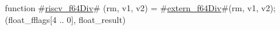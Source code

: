 function #\hyperref[sailRISCVzriscvzyf64Div]{riscv\_f64Div}# (rm, v1, v2) = {
  #\hyperref[sailRISCVzexternzyf64Div]{extern\_f64Div}#(rm, v1, v2);
  (float_fflags[4 .. 0], float_result)
}

